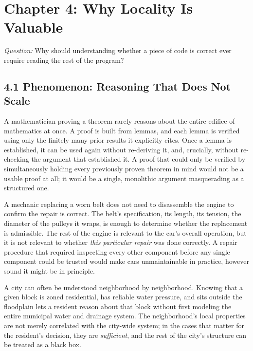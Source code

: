 \documentclass[11pt]{book}
\begin{document}
\clearpage

\chapter*{Chapter 4: Why Locality Is Valuable}

\begin{firstprinciples}
\textit{Question:} Why should understanding whether a piece of code is correct ever require reading the rest of the program?
\end{firstprinciples}

\section*{4.1 Phenomenon: Reasoning That Does Not Scale}

A mathematician proving a theorem rarely reasons about the entire edifice of mathematics at once. A proof is built from lemmas, and each lemma is verified using only the finitely many prior results it explicitly cites. Once a lemma is established, it can be used again without re-deriving it, and, crucially, without re-checking the argument that established it. A proof that could only be verified by simultaneously holding every previously proven theorem in mind would not be a usable proof at all; it would be a single, monolithic argument masquerading as a structured one.

A mechanic replacing a worn belt does not need to disassemble the engine to confirm the repair is correct. The belt's specification, its length, its tension, the diameter of the pulleys it wraps, is enough to determine whether the replacement is admissible. The rest of the engine is relevant to the car's overall operation, but it is not relevant to whether \emph{this particular repair} was done correctly. A repair procedure that required inspecting every other component before any single component could be trusted would make cars unmaintainable in practice, however sound it might be in principle.

A city can often be understood neighborhood by neighborhood. Knowing that a given block is zoned residential, has reliable water pressure, and sits outside the floodplain lets a resident reason about that block without first modeling the entire municipal water and drainage system. The neighborhood's local properties are not merely correlated with the city-wide system; in the cases that matter for the resident's decision, they are \emph{sufficient}, and the rest of the city's structure can be treated as a black box.
\end{document}

